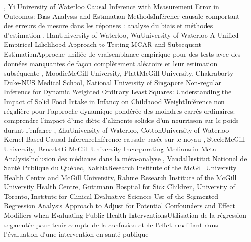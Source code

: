{
,  {Yi}
{University of Waterloo}
}
{Causal Inference with Measurement Error in Outcomes: Bias Analysis and Estimation Methods}{Inférence causale comportant des erreurs de mesure dans les réponses : analyse du biais et méthodes d’estimation}
{\bubbleE \enspace \screenE}
{
,  {Han}{University of Waterloo},  {Wu}{University of Waterloo}
}
{A Unified Empirical Likelihood Approach to Testing MCAR and Subsequent Estimation}{Approche unifiée de vraisemblance empirique pour des tests avec des données manquantes de façon complètement aléatoire et leur estimation subséquente }
{\bubbleE \enspace \screenE}
{
,  {Moodie}{McGill University},  {Platt}{McGill University},  {Chakraborty}
{Duke-NUS Medical School, National University of Singapore}
}
{Non-regular Inference for Dynamic Weighted Ordinary Least Squares: Understanding the Impact of Solid Food Intake in Infancy on Childhood Weight}{Inférence non régulière pour l'approche dynamique pondérée des moindres carrés ordinaires: comprendre l'impact d'une diète d'aliments solides d'un nourrisson sur le poids durant l'enfance}
{\bubbleE \enspace \screenE}
{
,  {Zhu}{University of Waterloo},  {Cotton}{University of Waterloo}
}
{Kernel-Based Causal Inference}{Inférence causale basée sur le noyau}
{\bubbleE \enspace \screenE}
{
,  {Steele}{McGill University},  {Benedetti}
{McGill University}
}
{Incorporating Medians in Meta-Analysis}{Inclusion des médianes dans la méta-analyse}
{\bubbleE \enspace \screenE}
{
,  {Vandal}{Institut National de Santé Publique du Québec},  {Nakhla}{Research Institute of the McGill University Health Centre and McGill University},  {Rahme}
{Research Institute of the McGill University Health Centre},  {Guttmann}
{Hospital for Sick Children, University of Toronto, Institute for Clinical Evaluative Sciences}
}
{Use of the Segmented Regression Analysis Approach to Adjust for Potential Confounders and Effect Modifiers when Evaluating Public Health Interventions}{Utilisation de la régression segmentée pour tenir compte de la confusion et de l’effet modifiant dans l’évaluation d’une intervention en santé publique}
{\bubbleE \enspace \screenE}


